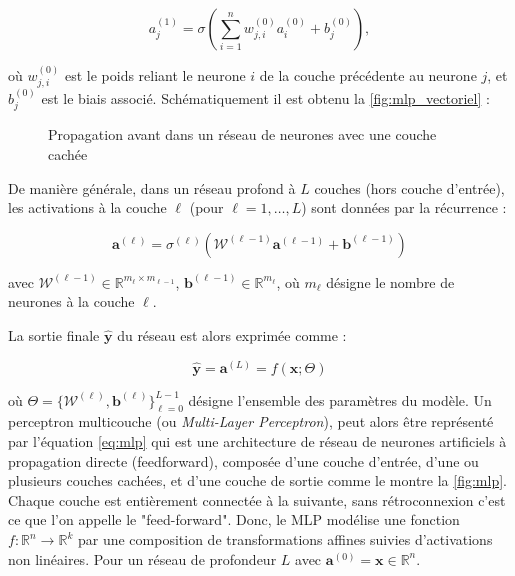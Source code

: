 \begin{equation}
a_j^{(1)} = \sigma\left( \sum_{i=1}^n w_{j,i}^{(0)} a_i^{(0)} + b_j^{(0)} \right),
\end{equation}

où \( w_{j,i}^{(0)} \) est le poids reliant le neurone \( i \) de la couche précédente au neurone \( j \), et \( b_j^{(0)} \) est le biais associé. Schématiquement il est obtenu la \autoref{fig:mlp_vectoriel} : 

\begin{figure}[H]
    \centering
    
    \caption{Propagation avant dans un réseau de neurones avec une couche cachée}
    \label{fig:mlp_vectoriel}
\end{figure}

De manière générale, dans un réseau profond à \( L \) couches (hors couche d'entrée), les activations à la couche \( \ell \) (pour \( \ell = 1, \dots, L \)) sont données par la récurrence :

\begin{equation}
\mathbf{a}^{(\ell)} = \sigma^{(\ell)}\left( \mathbf{\mathcal{W}}^{(\ell-1)} \mathbf{a}^{(\ell-1)} + \mathbf{b}^{(\ell-1)} \right)
\label{eq:mlp}
\end{equation}

avec \( \mathbf{\mathcal{W}}^{(\ell-1)} \in \mathbb{R}^{m_\ell \times m_{\ell-1}} \), \( \mathbf{b}^{(\ell-1)} \in \mathbb{R}^{m_\ell} \), où \( m_\ell \) désigne le nombre de neurones à la couche \( \ell \).

La sortie finale \( \hat{\mathbf{y}} \) du réseau est alors exprimée comme :

\begin{equation}
\hat{\mathbf{y}} = \mathbf{a}^{(L)} = f(\mathbf{x}; \Theta)
\end{equation}

où \( \Theta = \{ \mathbf{\mathcal{W}}^{(\ell)}, \mathbf{b}^{(\ell)} \}_{\ell=0}^{L-1} \) désigne l’ensemble des paramètres du modèle. Un perceptron multicouche (ou \textit{Multi-Layer Perceptron}), peut alors être représenté par l'équation \eqref{eq:mlp} qui est une architecture de réseau de neurones artificiels à propagation directe (feedforward), composée d’une couche d’entrée, d’une ou plusieurs couches cachées, et d’une couche de sortie comme le montre la \autoref{fig:mlp}. Chaque couche est entièrement connectée à la suivante, sans rétroconnexion c'est ce que l'on appelle le "feed-forward". Donc, le MLP modélise une fonction \( f : \mathbb{R}^n \rightarrow \mathbb{R}^k \) par une composition de transformations affines suivies d’activations non linéaires. Pour un réseau de profondeur \( L \) avec $\mathbf{a}^{(0)} = \mathbf{x} \in \mathbb{R}^n$.  

